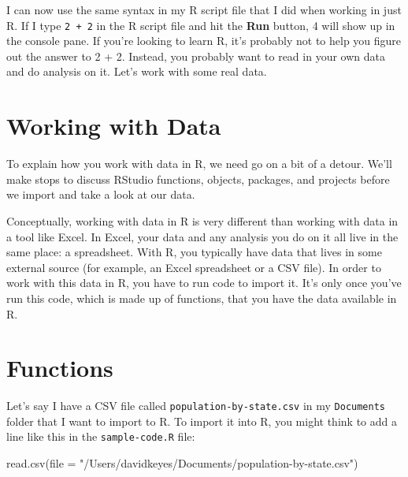 \documentclass[
]{book}
\newenvironment{Shaded}{\begin{snugshade}}{\end{snugshade}}
\newcommand{\AttributeTok}[1]{\textcolor[rgb]{0.77,0.63,0.00}{#1}}
\newcommand{\FunctionTok}[1]{\textcolor[rgb]{0.00,0.00,0.00}{#1}}
\newcommand{\NormalTok}[1]{#1}
\newcommand{\StringTok}[1]{\textcolor[rgb]{0.31,0.60,0.02}{#1}}
\begin{document}
I can now use the same syntax in my R script file that I did when working in just R. If I type \texttt{2\ +\ 2} in the R script file and hit the \textbf{Run} button, 4 will show up in the console pane. If you're looking to learn R, it's probably not to help you figure out the answer to 2 + 2. Instead, you probably want to read in your own data and do analysis on it. Let's work with some real data.

\hypertarget{working-with-data}{%
\section*{Working with Data}\label{working-with-data}}

To explain how you work with data in R, we need go on a bit of a detour. We'll make stops to discuss RStudio functions, objects, packages, and projects before we import and take a look at our data.

Conceptually, working with data in R is very different than working with data in a tool like Excel. In Excel, your data and any analysis you do on it all live in the same place: a spreadsheet. With R, you typically have data that lives in some external source (for example, an Excel spreadsheet or a CSV file). In order to work with this data in R, you have to run code to import it. It's only once you've run this code, which is made up of functions, that you have the data available in R.

\hypertarget{functions}{%
\section*{Functions}\label{functions}}

Let's say I have a CSV file called \texttt{population-by-state.csv} in my \texttt{Documents} folder that I want to import to R. To import it into R, you might think to add a line like this in the \texttt{sample-code.R} file:

\begin{Shaded}
\begin{Highlighting}[]
\FunctionTok{read.csv}\NormalTok{(}\AttributeTok{file =} \StringTok{"/Users/davidkeyes/Documents/population{-}by{-}state.csv"}\NormalTok{)}
\end{Highlighting}
\end{Shaded}
\end{document}
